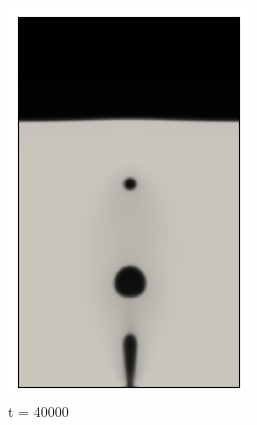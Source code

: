 \begin{figure}[H]
	\medskip
	\begin{subfigure}{0.25\textwidth}
		\includegraphics[width=\linewidth]{figs/cap4/bb_760_d40}
		\caption{t = 40000}
		\label{fig:7}
	\end{subfigure}\hfil
	\begin{subfigure}{0.25\textwidth}

\end{subfigure}
\end{figure}
